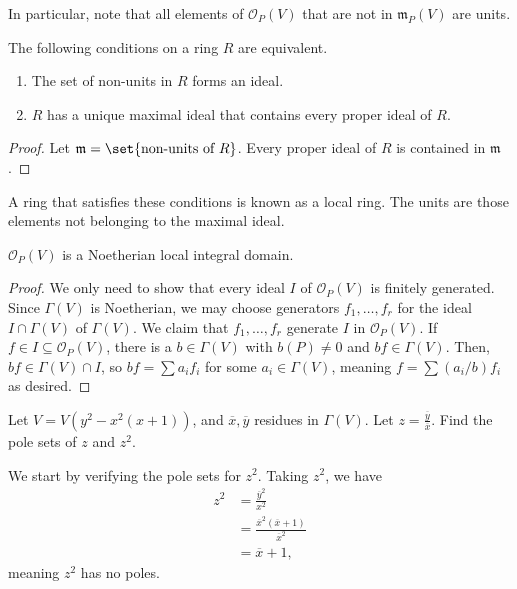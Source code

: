 \documentclass[10pt]{mypackage}
\begin{document}
In particular, note that all elements of $\mathcal{O}_P(V)$ that are not in $\mathfrak{m}_P(V)$ are units.
\begin{lemma}
  The following conditions on a ring $R$ are equivalent.
  \begin{enumerate}[(1)]
    \item The set of non-units in $R$ forms an ideal.
    \item $R$ has a unique maximal ideal that contains every proper ideal of $R$.
  \end{enumerate}
\end{lemma}
\begin{proof}
  Let $\mathfrak{m} = \set{\text{non-units of }R}$. Every proper ideal of $R$ is contained in $\mathfrak{m}$.
\end{proof}
A ring that satisfies these conditions is known as a local ring. The units are those elements not belonging to the maximal ideal. 
\begin{proposition}
  $\mathcal{O}_P(V)$ is a Noetherian local integral domain.
\end{proposition}
\begin{proof}
  We only need to show that every ideal $I$ of $\mathcal{O}_P(V)$ is finitely generated. Since $\Gamma(V)$ is Noetherian, we may choose generators $f_1,\dots,f_r$ for the ideal $I\cap \Gamma(V)$ of $\Gamma(V)$. We claim that $f_1,\dots,f_r$ generate $I$ in $\mathcal{O}_P(V)$. If $f\in I\subseteq \mathcal{O}_P(V)$, there is a $b\in \Gamma(V)$ with $b(P)\neq 0$ and $bf\in \Gamma(V)$. Then, $bf\in \Gamma(V)\cap I$, so $bf = \sum a_if_i$ for some $a_i\in \Gamma(V)$, meaning $f = \sum (a_i/b)f_i$ as desired.
\end{proof}

\begin{exercise}[Exercise 2.17]
  Let $V = V\left( y^2 - x^2\left( x+1 \right) \right)$, and $ \overline{x}, \overline{y} $ residues in $\Gamma(V)$. Let $z = \frac{ \overline{y} }{ \overline{x} }$. Find the pole sets of $z$ and $z^2$.
\end{exercise}
\begin{solution}
  We start by verifying the pole sets for $z^2$. Taking $z^2$, we have
  \begin{align*}
    z^2 &= \frac{ \overline{y}^2 }{x^2}\\
        &= \frac{ \overline{x}^2\left( \overline{x} + 1 \right) }{ \overline{x}^2 }\\
        &= \overline{x} + 1,
  \end{align*}
  meaning $z^2$ has no poles.
\end{solution}
\end{document}
